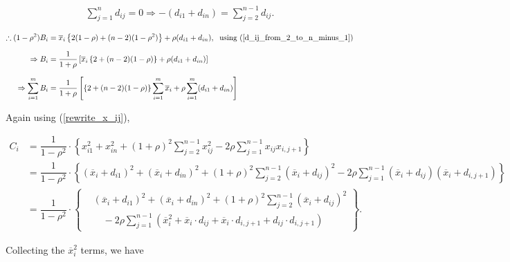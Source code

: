 \documentclass[11pt, a4paper]{article}
\begin{document}
\begin{itemize}
\begin{align}\label{d_ij_from_2_to_n_minus_1}
\sum \limits_{j = 1}^{n} d_{ij} = 0 \Rightarrow -(d_{i1} + d_{in}) = \sum \limits_{j = 2}^{n-1} d_{ij}.
\end{align}

\begin{align}\label{summation_B_i}
\therefore (1 - \rho^2) B_i &= \overline{x}_i \left\{ 2 (1 - \rho) + (n-2) (1 - \rho^2) \right\} + \rho (d_{i1} + d_{in}), \; \text{ using (\ref{d_ij_from_2_to_n_minus_1})} \nonumber \\[0.7em]
\Rightarrow B_i &= \dfrac{1}{1 + \rho} \left[ \overline{x}_i \left\{ 2 + (n-2) (1 - \rho) \right\} + \rho (d_{i1} + d_{in}) \right] \nonumber \\[0.7em]
\Rightarrow \sum \limits_{i = 1}^{m} B_i &= \dfrac{1}{1 + \rho} \left[ \left\{ 2 + (n-2) (1 - \rho) \right\} \sum \limits_{i = 1}^{m} \overline{x}_i + \rho \sum \limits_{i = 1}^{m} (d_{i1} + d_{in}) \right]
\end{align}

Again using (\ref{rewrite_x_ij}),

\begin{align}\label{C_i}
C_i &= \dfrac{1}{1 - \rho^2} \cdot \left\{x_{i1}^2 + x_{in}^2 + (1+\rho)^2 \sum \limits_{j = 2}^{n-1} x_{ij}^2 - 2\rho \sum \limits_{j = 1}^{n-1} x_{ij} x_{i,j+1}\right\} \nonumber \\[0.7em]
&= \dfrac{1}{1 - \rho^2} \cdot \left\{(\overline{x}_i + d_{i1})^2 + (\overline{x}_i + d_{in})^2 + (1+\rho)^2 \sum \limits_{j = 2}^{n-1} (\overline{x}_i + d_{ij})^2 - 2\rho \sum \limits_{j = 1}^{n-1} (\overline{x}_i + d_{ij}) (\overline{x}_i + d_{i,j+1})\right\} \nonumber \\[0.7em]
&= \dfrac{1}{1 - \rho^2} \cdot 
\left\{
\begin{aligned}
&(\overline{x}_i + d_{i1})^2 + (\overline{x}_i + d_{in})^2 + (1+\rho)^2 \sum \limits_{j = 2}^{n-1} (\overline{x}_i + d_{ij})^2 \\
&\quad - 2\rho \sum \limits_{j = 1}^{n-1} \left(\overline{x}_i^2 + \overline{x}_i \cdot d_{ij} + \overline{x}_i \cdot d_{i,j+1} + d_{ij} \cdot d_{i,j+1}\right)
\end{aligned}
\right\}.
\end{align}

\newpage

Collecting the $\overline{x}_i^2$ terms, we have


\end{itemize}
\end{document}
